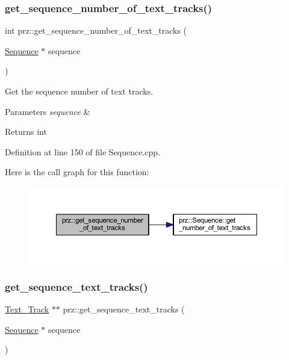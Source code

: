 \subsubsection{\texorpdfstring{get\_sequence\_number\_of\_text\_tracks()}{get\_sequence\_number\_of\_text\_tracks()}}
{\footnotesize\ttfamily int prz\+::get\+\_\+sequence\+\_\+number\+\_\+of\+\_\+text\+\_\+tracks (\begin{DoxyParamCaption}\item[{\mbox{\hyperlink{classprz_1_1_sequence}{Sequence}} $\ast$}]{sequence }\end{DoxyParamCaption})}



Get the sequence number of text tracks. 


\begin{DoxyParams}{Parameters}
{\em sequence} & \\
\hline
\end{DoxyParams}
\begin{DoxyReturn}{Returns}
int 
\end{DoxyReturn}


Definition at line 150 of file Sequence.\+cpp.

Here is the call graph for this function\+:
\nopagebreak
\begin{figure}[H]
\begin{center}
\leavevmode
\includegraphics[width=350pt]{namespaceprz_adc24118c391c79c034821170e7249c4d_cgraph}
\end{center}
\end{figure}
\mbox{\label{namespaceprz_a9f420e41b11dc1a0b8c5a22a9288ca46}} 
\subsubsection{\texorpdfstring{get\_sequence\_text\_tracks()}{get\_sequence\_text\_tracks()}}
{\footnotesize\ttfamily \mbox{\hyperlink{classprz_1_1_text___track}{Text\+\_\+\+Track}} $\ast$$\ast$ prz\+::get\+\_\+sequence\+\_\+text\+\_\+tracks (\begin{DoxyParamCaption}\item[{\mbox{\hyperlink{classprz_1_1_sequence}{Sequence}} $\ast$}]{sequence }\end{DoxyParamCaption})}



